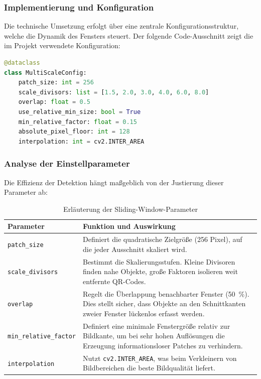 \documentclass[
    a4paper,        %
    11pt,           %
    ngerman,        %
    parskip=half,   %
    listof=totoc,   %
    bibliography=totoc %
]{scrartcl}
\begin{document}
\subsubsection{Implementierung und Konfiguration}

Die technische Umsetzung erfolgt über eine zentrale Konfigurationsstruktur, welche die Dynamik des Fensters steuert. Der folgende Code-Ausschnitt zeigt die im Projekt verwendete Konfiguration:

\begin{lstlisting}[language=Python, caption={Konfiguration der Sliding Window Parameter}]
@dataclass
class MultiScaleConfig:
    patch_size: int = 256
    scale_divisors: list = [1.5, 2.0, 3.0, 4.0, 6.0, 8.0]
    overlap: float = 0.5 
    use_relative_min_size: bool = True
    min_relative_factor: float = 0.15
    absolute_pixel_floor: int = 128
    interpolation: int = cv2.INTER_AREA
\end{lstlisting}

\subsubsection{Analyse der Einstellparameter}

Die Effizienz der Detektion hängt maßgeblich von der Justierung dieser Parameter ab:

\begin{table}[H]
    \centering
    \caption{Erläuterung der Sliding-Window-Parameter}
    \begin{tabular}{l p{9cm}}
        \toprule
        \textbf{Parameter} & \textbf{Funktion und Auswirkung} \\
        \midrule
        \texttt{patch\_size} & Definiert die quadratische Zielgröße (256 Pixel), auf die jeder Ausschnitt skaliert wird. \\
        \texttt{scale\_divisors} & Bestimmt die Skalierungsstufen. Kleine Divisoren finden nahe Objekte, große Faktoren isolieren weit entfernte QR-Codes. \\
        \texttt{overlap} & Regelt die Überlappung benachbarter Fenster (\SI{50}{\percent}). Dies stellt sicher, dass Objekte an den Schnittkanten zweier Fenster lückenlos erfasst werden. \\
        \texttt{min\_relative\_factor} & Definiert eine minimale Fenstergröße relativ zur Bildkante, um bei sehr hohen Auflösungen die Erzeugung informationsloser Patches zu verhindern. \\
        \texttt{interpolation} & Nutzt \texttt{cv2.INTER\_AREA}, was beim Verkleinern von Bildbereichen die beste Bildqualität liefert. \\
        \bottomrule
    \end{tabular}
\end{table}
\end{document}
